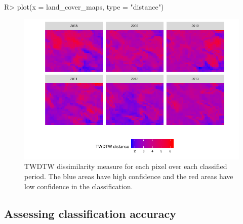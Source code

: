 \documentclass[article,shortnames]{jss}
\begin{document}
\begin{CodeChunk}

\begin{CodeInput}
R> plot(x = land_cover_maps, type = "distance")
\end{CodeInput}
\begin{figure}[!h]

{\centering \includegraphics{dtwSat_files/figure-latex/plot-dissmilarity-1} 

}

\caption[TWDTW dissimilarity measure for each pixel over each classified period]{TWDTW dissimilarity measure for each pixel over each classified period. The blue areas have high confidence and the red areas have low confidence in the classification.}\label{fig:plot-dissmilarity}
\end{figure}
\end{CodeChunk}

\hypertarget{assessing-classification-accuracy}{%
\subsection{Assessing classification
accuracy}\label{assessing-classification-accuracy}}
\end{document}
